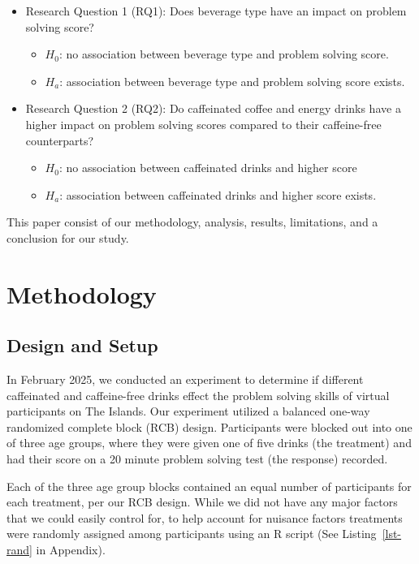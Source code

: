 \documentclass[
  letterpaper,
  DIV=11,
  numbers=noendperiod]{scrartcl}
\begin{document}
\begin{itemize}
\item
  Research Question 1 (RQ1): Does beverage type have an impact on
  problem solving score?

  \begin{itemize}
  \item
    \(H_{0}\): no association between beverage type and problem solving
    score.
  \item
    \(H_{a}\): association between beverage type and problem solving
    score exists.
  \end{itemize}
\item
  Research Question 2 (RQ2): Do caffeinated coffee and energy drinks
  have a higher impact on problem solving scores compared to their
  caffeine-free counterparts?

  \begin{itemize}
  \item
    \(H_{0}\): no association between caffeinated drinks and higher
    score
  \item
    \(H_{a}\): association between caffeinated drinks and higher score
    exists.
  \end{itemize}
\end{itemize}

This paper consist of our methodology, analysis, results, limitations,
and a conclusion for our study.

\section{Methodology}\label{methodology}

\subsection{Design and Setup}\label{design-and-setup}

In February 2025, we conducted an experiment to determine if different
caffeinated and caffeine-free drinks effect the problem solving skills
of virtual participants on The Islands. Our experiment utilized a
balanced one-way randomized complete block (RCB) design. Participants
were blocked out into one of three age groups, where they were given one
of five drinks (the treatment) and had their score on a 20 minute
problem solving test (the response) recorded.

Each of the three age group blocks contained an equal number of
participants for each treatment, per our RCB design. While we did not
have any major factors that we could easily control for, to help account
for nuisance factors treatments were randomly assigned among
participants using an R script (See Listing~\ref{lst-rand} in Appendix).
\end{document}
